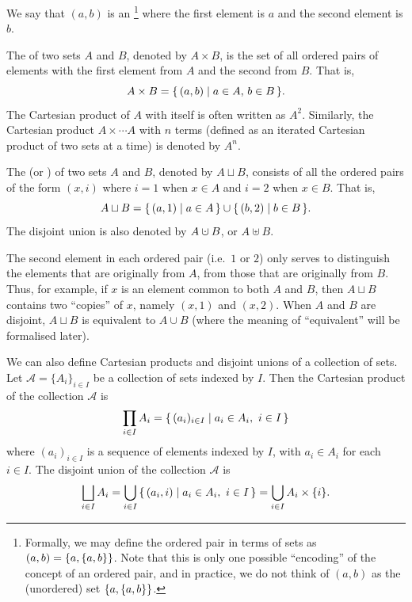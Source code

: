 We say that $(a, b)$ is an \footnote{Formally, we may define the ordered pair in terms of sets as $(a, b) = \qty{a, \qty{a, b}}$. Note that this is only one possible ``encoding'' of the concept of an ordered pair, and in practice, we do not think of $(a, b)$ as the (unordered) set $\qty{a, \qty{a, b}}$.} where the first element is $a$ and the second element is $b$.

The  of two sets $A$ and $B$, denoted by $A \times B$, is the set of all ordered pairs of elements with the first element from $A$ and the second from $B$. That is,
\begin{equation*}
A \times B = \qty{\, (a, b) \mid a \in A,\, b \in B \,}.
\end{equation*}
The Cartesian product of $A$ with itself is often written as $A^2$. Similarly, the Cartesian product $A \times \cdots A$ with $n$ terms (defined as an iterated Cartesian product of two sets at a time) is denoted by $A^n$. 

The  (or ) of two sets $A$ and $B$, denoted by $A \sqcup B$, consists of all the ordered pairs of the form $(x, i)$ where $i = 1$ when $x \in A$ and $i = 2$ when $x \in B$. That is,
\begin{equation*}
A \sqcup B = \qty{\, (a, 1) \mid a \in A \,} \cup \qty{\, (b, 2) \mid b \in B \,}.
\end{equation*}
The disjoint union is also denoted by $A \mathbin{\mathaccent\cdot\cup} B$, or $A \uplus B$.

\begin{Note*}
The second element in each ordered pair (i.e.\ $1$ or $2$) only serves to distinguish the elements that are originally from $A$, from those that are originally from $B$. Thus, for example, if $x$ is an element common to both $A$ and $B$, then $A \sqcup B$ contains two ``copies'' of $x$, namely $(x, 1)$ and $(x, 2)$. When $A$ and $B$ are disjoint, $A \sqcup B$ is equivalent to $A \cup B$ (where the meaning of ``equivalent'' will be formalised later).
\end{Note*}

We can also define Cartesian products and disjoint unions of a collection of sets. Let $\mathcal A = \{A_i\}_{i \in I}$ be a collection of sets indexed by $I$. Then the Cartesian product of the collection $\mathcal A$ is
\begin{equation*}
\prod_{i \in I} A_i = \qty{\, (a_i)_{i \in I} \mid a_i \in A_i,~ i \in I \,}
\end{equation*}
where $(a_i)_{i \in I}$ is a sequence of elements indexed by $I$, with $a_i \in A_i$ for each $i \in I$. The disjoint union of the collection $\mathcal A$ is
\begin{equation*}
\bigsqcup_{i \in I} A_i = \bigcup_{i \in I} \qty{\, (a_i, i) \mid a_i \in A_i,~ i \in I \,} = \bigcup_{i \in I} A_i \times \{i\}.
\end{equation*}

